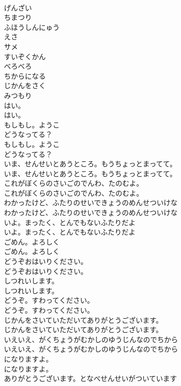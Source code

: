 \documentclass[8pt]{extreport}
\begin{document}
\begin{CJK}{UTF8}{min}
\\	げんざい
\\	ちまつり
\\	ふほうしんにゅう
\\	えさ
\\	サメ
\\	すいぞくかん
\\	べろべろ
\\	ちからになる
\\	じかんをさく
\\	みつもり
\\	はい。
\\	はい。
\\	もしもし。ようこ
\\	どうなってる？
\\	もしもし。ようこ
\\	どうなってる？
\\	いま、せんせいとあうところ。もうちょっとまってて。
\\	いま、せんせいとあうところ。もうちょっとまってて。
\\	これがぼくらのさいごのでんわ、たのむよ。
\\	これがぼくらのさいごのでんわ、たのむよ。
\\	わかったけど、ふたりのせいできょうのめんせついけな
\\	わかったけど、ふたりのせいできょうのめんせついけな
\\	いよ。まったく、とんでもないふたりだよ
\\	いよ。まったく、とんでもないふたりだよ
\\	ごめん。よろしく
\\	ごめん。よろしく
\\	どうぞおはいりください。
\\	どうぞおはいりください。
\\	しつれいします。
\\	しつれいします。
\\	どうぞ。すわってください。
\\	どうぞ。すわってください。
\\	じかんをさいていただいてありがとうございます。
\\	じかんをさいていただいてありがとうございます。
\\	いえいえ、がくちょうがむかしのゆうじんなのでちから
\\	いえいえ、がくちょうがむかしのゆうじんなのでちから
\\	になりますよ。
\\	になりますよ。
\\	ありがとうございます。となべせんせいがついています

\end{CJK}
\end{document}
